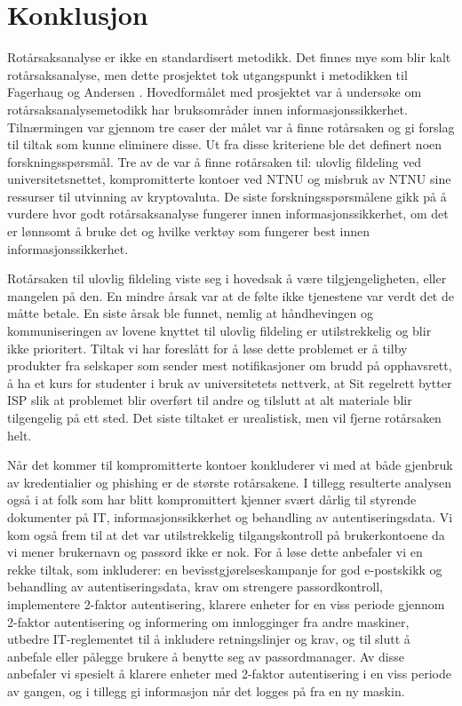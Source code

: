 \chapter{Konklusjon}
\label{kap:konklusjon}
Rotårsaksanalyse er ikke en standardisert metodikk. Det finnes mye som blir kalt rotårsaksanalyse, men dette prosjektet tok utgangspunkt i metodikken til Fagerhaug og Andersen \cite{RCA}. Hovedformålet med prosjektet var å undersøke om rotårsaksanalysemetodikk har bruksområder innen informasjonssikkerhet. Tilnærmingen var gjennom tre caser der målet var å finne rotårsaken og gi forslag til tiltak som kunne eliminere disse. Ut fra disse kriteriene ble det definert noen forskningsspørsmål. Tre av de var å finne rotårsaken til: ulovlig fildeling ved universitetsnettet, kompromitterte kontoer ved NTNU og misbruk av NTNU sine ressurser til utvinning av kryptovaluta. De siste forskningsspørsmålene gikk på å vurdere hvor godt rotårsaksanalyse fungerer innen informasjonssikkerhet, om det er lønnsomt å bruke det og hvilke verktøy som fungerer best innen informasjonssikkerhet. 
\newline

\noindent Rotårsaken til ulovlig fildeling viste seg i hovedsak å være tilgjengeligheten, eller mangelen på den. En mindre årsak var at de følte ikke tjenestene var verdt det de måtte betale. En siste årsak ble funnet, nemlig at håndhevingen og kommuniseringen av lovene knyttet til ulovlig fildeling er utilstrekkelig og blir ikke prioritert. Tiltak vi har foreslått for å løse dette problemet er å tilby produkter fra selskaper som sender mest notifikasjoner om brudd på opphavsrett, å ha et kurs for studenter i bruk av universitetets nettverk, at Sit regelrett bytter ISP slik at problemet blir overført til andre og tilslutt at alt materiale blir tilgengelig på ett sted. Det siste tiltaket er urealistisk, men vil fjerne rotårsaken helt. 
\newline

\noindent Når det kommer til kompromitterte kontoer konkluderer vi med at både gjenbruk av kredentialier og phishing er de største rotårsakene. I tillegg resulterte analysen også i at folk som har blitt kompromittert kjenner svært dårlig til styrende dokumenter på IT, informasjonssikkerhet og behandling av autentiseringsdata. Vi kom også frem til at det var utilstrekkelig tilgangskontroll på brukerkontoene da vi mener brukernavn og passord ikke er nok. For å løse dette anbefaler vi en rekke tiltak, som inkluderer: en bevisstgjørelseskampanje for god e-postskikk og behandling av autentiseringsdata, krav om strengere passordkontroll, implementere 2-faktor autentisering, klarere enheter for en viss periode gjennom 2-faktor autentisering og informering om innlogginger fra andre maskiner, utbedre IT-reglementet til å inkludere retningslinjer og krav, og til slutt å anbefale eller pålegge brukere å benytte seg av passordmanager. Av disse anbefaler vi spesielt å klarere enheter med 2-faktor autentisering i en viss periode av gangen, og i tillegg gi informasjon når det logges på fra en ny maskin. 
\newline

